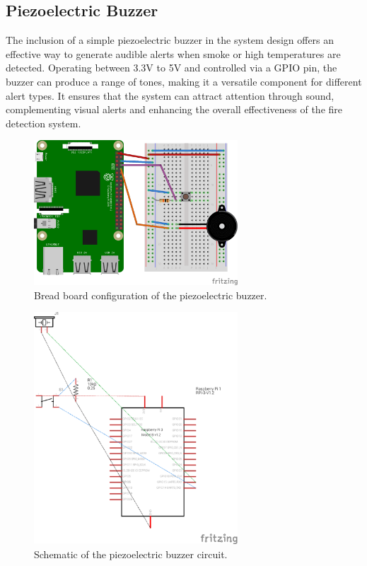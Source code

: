 \subsection{Piezoelectric Buzzer}

The inclusion of a simple piezoelectric buzzer in the system design offers an effective way to generate audible alerts
when smoke or high temperatures are detected. Operating between 3.3V to 5V and controlled via a GPIO pin, the buzzer
can produce a range of tones, making it a versatile component for different alert types. It ensures that the system can
attract attention through sound, complementing visual alerts and enhancing the overall effectiveness of the fire
detection system.

\begin{figure}[H]
    \centering
    \includegraphics[width=3in]{../assets/BuzzerBB.png}
    \caption{Bread board configuration of the piezoelectric buzzer.}
\end{figure}

\begin{figure}[H]
    \centering
    \includegraphics[width=3in]{../assets/BuzzerSchema.png}
    \caption{Schematic of the piezoelectric buzzer circuit.}
\end{figure}

